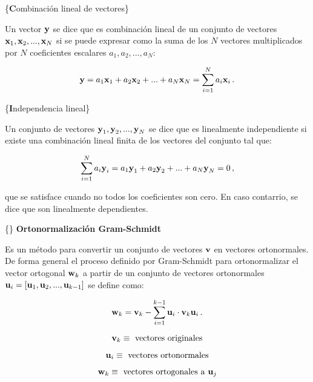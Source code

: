 \documentclass[
]{agujournal2019}
\begin{document}
\vspace{0.5cm}

\{\noindent \textbf Combinación lineal de vectores\}

Un vector \({\textbf y}\) se dice que es combinación lineal de un
conjunto de vectores \({\textbf x}_1, {\textbf x}_2, ...,{\textbf x}_N\)
si se puede expresar como la suma de los \(N\) vectores multiplicados
por \(N\) coeficientes escalares \(a_1,a_2,...,a_N\):

\[{\textbf y}=a_1 {\textbf x}_1 + a_2 {\textbf x}_2 +...+a_N {\textbf x}_N=\sum\limits^N_{i=1}a_i {\textbf x}_i\,.\]

\vspace{0.5cm}

\{\noindent \textbf Independencia lineal\}

Un conjunto de vectores
\({\textbf y}_1, {\textbf y}_2, ...,{\textbf y}_N\) se dice que es
linealmente independiente si existe una combinación lineal finita de los
vectores del conjunto tal que:

\[\sum\limits^N_{i=1} a_i {\textbf y}_i=a_1{\textbf y}_1 + a_2{\textbf y}_2+...+a_N{\textbf y}_N=0\,,\]

que se satisface cuando no todos los coeficientes son cero. En caso
contarrio, se dice que son linealmente dependientes.

\vspace{0.5cm}

\{\noindent\} \textbf{Ortonormalización Gram-Schmidt}

Es un método para convertir un conjunto de vectores \({\textbf v}\) en
vectores ortonormales. De forma general el proceso definido por
Gram-Schmidt para ortonormalizar el vector ortogonal \({\textbf w}_k\) a
partir de un conjunto de vectores ortonormales
\({\textbf u}_i=[{\textbf u}_1, {\textbf u}_2,...,{\textbf u}_{k-1}]\)
se define como:

\[{\textbf w}_k={\textbf v}_k-\sum\limits^{k-1}_{i=1} {\textbf u}_i\cdot{\textbf v}_k{\textbf u}_i\,.\]

\vspace{0.25cm}

\[{\textbf v}_k\equiv\,\,{\rm vectores}\,\,{\rm originales}\]

\[{\textbf u}_i\equiv\,\,{\rm vectores}\,\,{\rm ortonormales}\]

\[{\textbf w}_k\equiv\,\,{\rm vectores}\,\,{\rm ortogonales}\,\,{\rm a}\,\,{\textbf u}_j\]

\vspace{0.25cm}
\end{document}
